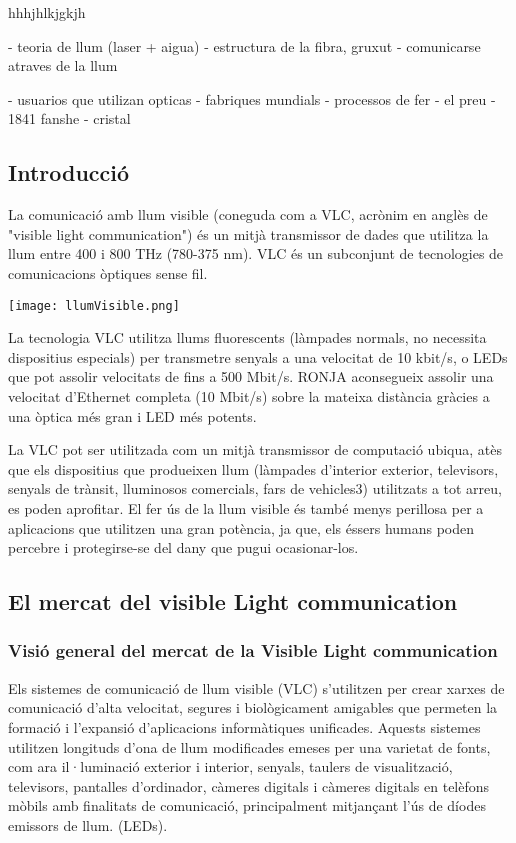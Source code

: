 

hhhjhlkjgkjh

- teoria de llum (laser + aigua)
- estructura de la fibra, gruxut
- comunicarse atraves de la llum

- usuarios que utilizan opticas
- fabriques mundials
- processos de fer
- el preu
- 1841 fanshe
- cristal

\subsection*{Introducció}
La comunicació amb llum visible (coneguda com a VLC, acrònim en anglès de "visible light communication") és un mitjà transmissor de dades que utilitza la llum entre 400 i 800 THz (780-375 nm). VLC és un subconjunt de tecnologies de comunicacions òptiques sense fil.



\begin{center}
    \texttt{[image: llumVisible.png]}\\\vfill
\end{center}

La tecnologia  VLC utilitza llums fluorescents (làmpades normals, no necessita dispositius especials) per transmetre senyals a una velocitat de 10 kbit/s, o LEDs que pot assolir velocitats de fins a 500 Mbit/s. RONJA aconsegueix assolir una velocitat d'Ethernet completa (10 Mbit/s) sobre la mateixa distància gràcies a una òptica més gran i LED més potents.

La VLC pot ser utilitzada com un mitjà transmissor de computació ubiqua, atès que els dispositius que produeixen llum (làmpades d'interior exterior, televisors, senyals de trànsit, lluminosos comercials, fars de vehicles3) utilitzats a tot arreu, es poden aprofitar. El fer ús de la llum visible és també menys perillosa per a aplicacions que utilitzen una gran potència, ja que, els éssers humans poden percebre i protegirse-se del dany que pugui ocasionar-los.




\subsection*{El mercat del visible Light communication}

\subsubsection*{Visió general del mercat de la Visible Light communication}
Els sistemes de comunicació de llum visible (VLC) s'utilitzen per crear xarxes de comunicació d'alta velocitat, segures i biològicament amigables que permeten la formació i l'expansió d'aplicacions informàtiques unificades. Aquests sistemes utilitzen longituds d'ona de llum modificades emeses per una varietat de fonts, com ara il·luminació exterior i interior, senyals, taulers de visualització, televisors, pantalles d'ordinador, càmeres digitals i càmeres digitals en telèfons mòbils amb finalitats de comunicació, principalment mitjançant l'ús de díodes emissors de llum. (LEDs).

